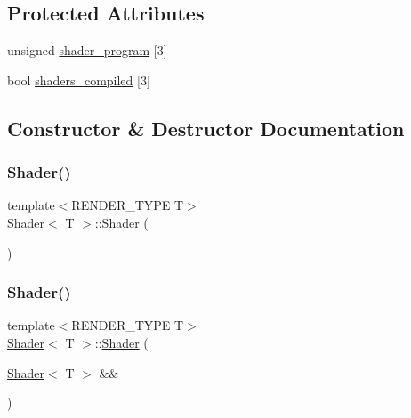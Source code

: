 \subsection*{Protected Attributes}
\begin{DoxyCompactItemize}
\item 
unsigned \mbox{\hyperlink{classShader_af8ec4edd2b1b56f32ce416280ff9b9e1}{shader\+\_\+program}} \mbox{[}3\mbox{]}
\item 
bool \mbox{\hyperlink{classShader_a057162ea090f838f7fbb658cb301efc4}{shaders\+\_\+compiled}} \mbox{[}3\mbox{]}
\end{DoxyCompactItemize}


\subsection{Constructor \& Destructor Documentation}
\mbox{\label{classShader_a02faa1d7140779d7a24e06d1aff58d68}} 
\subsubsection{\texorpdfstring{Shader()}{Shader()}\hspace{0.1cm}{\footnotesize\ttfamily [1/3]}}
{\footnotesize\ttfamily template$<$R\+E\+N\+D\+E\+R\+\_\+\+T\+Y\+PE T$>$ \\
\mbox{\hyperlink{classShader}{Shader}}$<$ T $>$\+::\mbox{\hyperlink{classShader}{Shader}} (\begin{DoxyParamCaption}{ }\end{DoxyParamCaption})\hspace{0.3cm}{\ttfamily [inline]}}

\mbox{\label{classShader_ab3e3c7604cc25077b6b41353535b54de}} 
\subsubsection{\texorpdfstring{Shader()}{Shader()}\hspace{0.1cm}{\footnotesize\ttfamily [2/3]}}
{\footnotesize\ttfamily template$<$R\+E\+N\+D\+E\+R\+\_\+\+T\+Y\+PE T$>$ \\
\mbox{\hyperlink{classShader}{Shader}}$<$ T $>$\+::\mbox{\hyperlink{classShader}{Shader}} (\begin{DoxyParamCaption}\item[{\mbox{\hyperlink{classShader}{Shader}}$<$ T $>$ \&\&}]{ }\end{DoxyParamCaption})\hspace{0.3cm}{\ttfamily [default]}}

